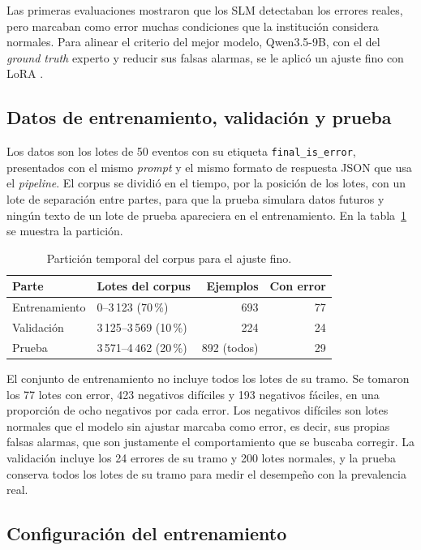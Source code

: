 Las primeras evaluaciones mostraron que los SLM detectaban los errores reales, pero marcaban como error muchas condiciones que la institución considera normales. Para alinear el criterio del mejor modelo, Qwen3.5-9B, con el del \textit{ground truth} experto y reducir sus falsas alarmas, se le aplicó un ajuste fino con LoRA \cite{hu2022_lora}.

\subsection{Datos de entrenamiento, validación y prueba}

Los datos son los lotes de 50 eventos con su etiqueta \texttt{final\_is\_error}, presentados con el mismo \textit{prompt} y el mismo formato de respuesta JSON que usa el \textit{pipeline}. El corpus se dividió en el tiempo, por la posición de los lotes, con un lote de separación entre partes, para que la prueba simulara datos futuros y ningún texto de un lote de prueba apareciera en el entrenamiento. En la tabla~\ref{tab:met_particion} se muestra la partición.

\begin{table}[H]
\centering
\caption{Partición temporal del corpus para el ajuste fino.}
\label{tab:met_particion}
\small
\begin{tabular}{@{}llrr@{}}
\toprule
\textbf{Parte} & \textbf{Lotes del corpus} & \textbf{Ejemplos} & \textbf{Con error} \\
\midrule
Entrenamiento & 0--3\,123 (70\,\%) & 693 & 77 \\
Validación & 3\,125--3\,569 (10\,\%) & 224 & 24 \\
Prueba & 3\,571--4\,462 (20\,\%) & 892 (todos) & 29 \\
\bottomrule
\end{tabular}
\normalsize
\end{table}

El conjunto de entrenamiento no incluye todos los lotes de su tramo. Se tomaron los 77 lotes con error, 423 negativos difíciles y 193 negativos fáciles, en una proporción de ocho negativos por cada error. Los negativos difíciles son lotes normales que el modelo sin ajustar marcaba como error, es decir, sus propias falsas alarmas, que son justamente el comportamiento que se buscaba corregir. La validación incluye los 24 errores de su tramo y 200 lotes normales, y la prueba conserva todos los lotes de su tramo para medir el desempeño con la prevalencia real.

\subsection{Configuración del entrenamiento}

